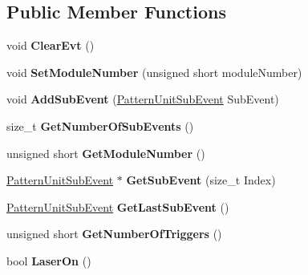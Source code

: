 \subsection*{Public Member Functions}
\begin{DoxyCompactItemize}
\item 
\hypertarget{class_pattern_unit_ac9996fb9db38fad22cd57fce80f6dd77}{void {\bfseries Clear\-Evt} ()}\label{class_pattern_unit_ac9996fb9db38fad22cd57fce80f6dd77}

\item 
\hypertarget{class_pattern_unit_a14ae7bedf1a45782eec52f50d3ae4349}{void {\bfseries Set\-Module\-Number} (unsigned short module\-Number)}\label{class_pattern_unit_a14ae7bedf1a45782eec52f50d3ae4349}

\item 
\hypertarget{class_pattern_unit_a9d34e1e9f1a313afb387a008f10fc1e5}{void {\bfseries Add\-Sub\-Event} (\hyperlink{class_pattern_unit_sub_event}{Pattern\-Unit\-Sub\-Event} Sub\-Event)}\label{class_pattern_unit_a9d34e1e9f1a313afb387a008f10fc1e5}

\item 
\hypertarget{class_pattern_unit_afc5e06336605ed36e329017cf96e7ba9}{size\-\_\-t {\bfseries Get\-Number\-Of\-Sub\-Events} ()}\label{class_pattern_unit_afc5e06336605ed36e329017cf96e7ba9}

\item 
\hypertarget{class_pattern_unit_a76203a82503fc512426839b394bb39d3}{unsigned short {\bfseries Get\-Module\-Number} ()}\label{class_pattern_unit_a76203a82503fc512426839b394bb39d3}

\item 
\hypertarget{class_pattern_unit_ae664a0f15c9b3b6fe3809b68838b9522}{\hyperlink{class_pattern_unit_sub_event}{Pattern\-Unit\-Sub\-Event} $\ast$ {\bfseries Get\-Sub\-Event} (size\-\_\-t Index)}\label{class_pattern_unit_ae664a0f15c9b3b6fe3809b68838b9522}

\item 
\hypertarget{class_pattern_unit_a914db6bc2faec9ee115aa8006be3fbf8}{\hyperlink{class_pattern_unit_sub_event}{Pattern\-Unit\-Sub\-Event} {\bfseries Get\-Last\-Sub\-Event} ()}\label{class_pattern_unit_a914db6bc2faec9ee115aa8006be3fbf8}

\item 
\hypertarget{class_pattern_unit_ab2eba4fd8bb10266198efb2aea53a789}{unsigned short {\bfseries Get\-Number\-Of\-Triggers} ()}\label{class_pattern_unit_ab2eba4fd8bb10266198efb2aea53a789}

\item 
\hypertarget{class_pattern_unit_abac0e1b9460239ec7cbcdb050f995193}{bool {\bfseries Laser\-On} ()}\label{class_pattern_unit_abac0e1b9460239ec7cbcdb050f995193}


\end{DoxyCompactItemize}
